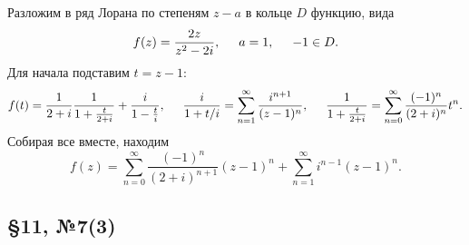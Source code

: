 Разложим в ряд Лорана по степеням $z-a$ в кольце $D$ функцию, вида
\begin{equation*}
    f(z) = \frac{2 z}{z^2 - 2 i},
    \hspace{5 mm} 
    a = 1, 
    \hspace{5 mm} 
    -1 \in D.
\end{equation*}
Для начала подставим $t = z - 1$:
\begin{equation*}
    f(t) = \frac{1}{2 + i} \frac{1}{1 + \frac{t}{2+i}} + \frac{i}{1 - \frac{t}{i}},
    \hspace{5 mm} 
    \frac{i}{1 + t/i} = \sum_{n=1}^{\infty}  \frac{i^{n+1}}{(z-1)^n},
    \hspace{5 mm} 
    \frac{1}{1 + \frac{t}{2+i}} = \sum_{n=0}^{\infty}  \frac{(-1)^n}{(2+i)^n} t^n.
\end{equation*}
Собирая все вместе, находим
\begin{equation*}
    f(z) = \sum_{n=0}^{\infty}  \frac{(-1)^n}{(2 + i)^{n+1}} (z-1)^n + 
    \sum_{n=1}^{\infty} i^{n-1} (z-1)^n.
\end{equation*}





\subsection*{\S11, №7(3)}




